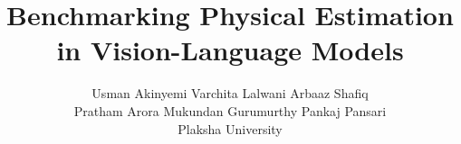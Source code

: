 \documentclass[10pt,twocolumn,letterpaper]{article}
\title{Benchmarking Physical Estimation in Vision-Language Models}
\author{Usman Akinyemi \quad Varchita Lalwani \quad Arbaaz Shafiq \\ Pratham Arora \quad Mukundan Gurumurthy \quad Pankaj Pansari\\
\newline
Plaksha University\\
}
\begin{document}
\maketitle
    





{
    \small
    
    
}

% 
\end{document}
